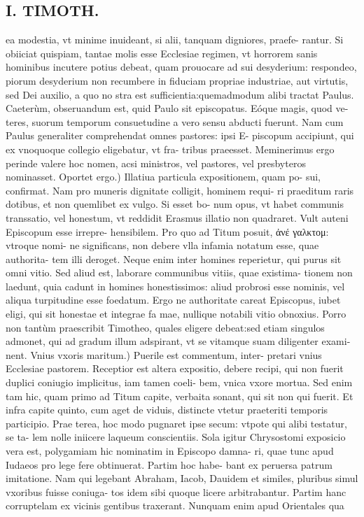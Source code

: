 \documentclass{article}
\begin{document}
\begin{pages}
\section*{I. TIMOTH. }
\marginpar{[ p.32 ]}\pstart ea modestia, vt minime inuideant, si alii, tanquam digniores, praefe- rantur. Si obiiciat quispiam, tantae molis esse Ecclesiae regimen, vt horrorem sanis hominibus incutere potius debeat, quam prouocare ad sui desyderium: respondeo, piorum desyderium non recumbere in fiduciam propriae industriae, aut virtutis, sed Dei auxilio, a quo no stra est sufficientia:quemadmodum alibi tractat Paulus. Caeterùm, obseruandum est, quid Paulo sit episcopatus. Eóque magis, quod ve- teres, suorum temporum consuetudine a vero sensu abducti fuerunt. Nam cum Paulus generaliter comprehendat omnes pastores: ipsi E- piscopum accipiunt, qui ex vnoquoque collegio eligebatur, vt fra- tribus praeesset. Meminerimus ergo perinde valere hoc nomen, acsi ministros, vel pastores, vel presbyteros nominasset.  \pend\pstart Oportet ergo.) Illatiua particula expositionem, quam po- sui, confirmat. Nam pro muneris dignitate colligit, hominem requi- ri praeditum raris dotibus, et non quemlibet ex vulgo. Si esset bo- num opus, vt habet communis transsatio, vel honestum, vt reddidit Erasmus illatio non quadraret. Vult auteni Episcopum esse irrepre- hensibilem. Pro quo ad Titum posuit, ἀνέ γαλκτομ: vtroque nomi- ne significans, non debere vlla infamia notatum esse, quae authorita- tem illi deroget. Neque enim inter homines reperietur, qui purus sit omni vitio. Sed aliud est, laborare communibus vitiis, quae existima- tionem non laedunt, quia cadunt in homines honestissimos: aliud probrosi esse nominis, vel aliqua turpitudine esse foedatum. Ergo ne authoritate careat Episcopus, iubet eligi, qui sit honestae et integrae fa mae, nullique notabili vitio obnoxius. Porro non tantùm praescribit Timotheo, quales eligere debeat:sed etiam singulos admonet, qui ad gradum illum adspirant, vt se vitamque suam diligenter exami- nent.  \pend\pstart Vnius vxoris maritum.) Puerile est commentum, inter- pretari vnius Ecclesiae pastorem. Receptior est altera expositio, debere recipi, qui non fuerit duplici coniugio implicitus, iam tamen coeli- bem, vnica vxore mortua. Sed enim tam hic, quam primo ad Titum capite, verbaita sonant, qui sit non qui fuerit. Et infra capite quinto, cum aget de viduis, distincte vtetur praeteriti temporis participio. Prae terea, hoc modo pugnaret ipse secum: vtpote qui alibi testatur, se ta- lem nolle iniicere laqueum conscientiis. Sola igitur Chrysostomi exposicio vera est, polygamiam hic nominatim in Episcopo damna- ri, quae tunc apud Iudaeos pro lege fere obtinuerat. Partim hoc habe- bant ex peruersa patrum imitatione. Nam qui legebant Abraham, Iacob, Dauidem et similes, pluribus simul vxoribus fuisse coniuga- tos idem sibi quoque licere arbitrabantur. Partim hanc corruptelam ex vicinis gentibus traxerant. Nunquam enim apud Orientales qua  \pend

\end{pages}
\end{document}
